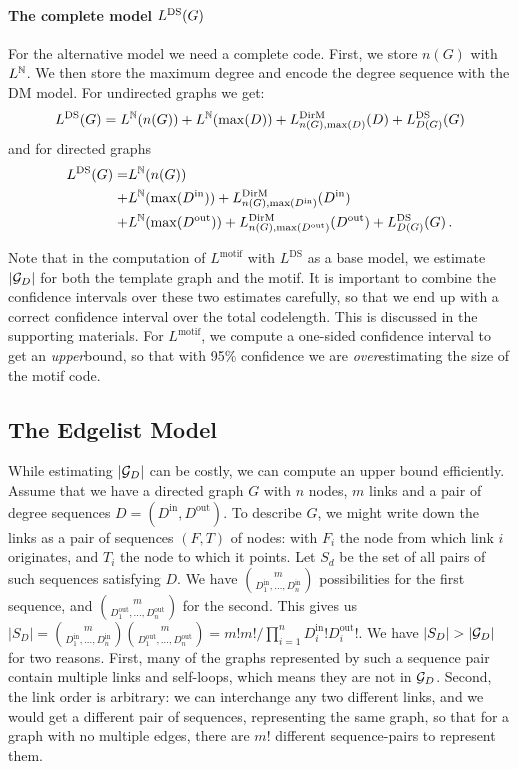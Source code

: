 \paragraph{The complete model $L^\textnormal{DS}(G)$} For the alternative model we need a complete code. First, we store $n(G)$ with $L^{\mathbb N}$. We then store the maximum degree and encode the degree sequence with the DM model. For undirected graphs we get: 
\[
L^\text{DS}(G) = L^{\mathbb N}(n(G)) + L^{\mathbb N}(\max(D)) + L^\text{DirM}_{n(G), \max(D)}(D) + L^\text{DS}_{D(G)}(G)
\]
and for directed graphs
\begin{align*}
L^\text{DS}(G) = &L^{\mathbb N}(n(G)) \\ 
 + &L^{\mathbb N}(\max(D^\text{in})) + L^\text{DirM}_{n(G), \max(D^\text{in})}(D^\text{in})\\
 + &L^{\mathbb N}(\max(D^\text{out})) + L^\text{DirM}_{n(G), \max(D^\text{out})}(D^\text{out}) + L^\text{DS}_{D(G)}(G) \,\text{.}
\end{align*} 

Note that in the computation of $L^\text{motif}$ with $L^\text{DS}$ as a base model, we estimate $|{\mathcal G}_D|$ for both the template graph and the motif. It is important to combine the confidence intervals over these two estimates carefully, so that we end up with a correct confidence interval over the total codelength. This is discussed in the supporting materials. For $L^\text{motif}$, we compute a one-sided confidence interval to get an \emph{upper}bound, so that with 95\% confidence we are \emph{over}estimating the size of the motif code. 

\subsection*{The Edgelist Model}

While estimating $|{\mathcal G}_D|$ can be costly, we can compute an upper bound efficiently. Assume that we have a directed graph $G$ with $n$ nodes, $m$ links and a pair of degree sequences $D = (D^\text{in}, D^\text{out})$. To describe $G$, we might write down the links as a pair of sequences $(F, T)$ of nodes: with  $F_i$ the node from which link $i$ originates, and $T_i$ the node to which it points. Let $S_d$ be the set of all pairs of such sequences satisfying $D$. We have $ m \choose D_1^\text{in}, \ldots, D_n^\text{in}$ possibilities for the first sequence, and $m \choose D_1^\text{out}, \ldots, D_n^\text{out}$ for the second. This gives us $|S_D| = {m \choose D_1^\text{in}, \ldots, D_n^\text{in}}{m \choose D_1^\text{out}, \ldots, D_n^\text{out}} = m!m! / \prod_{i=1}^n D^\text{in}_i ! D^\text{out}_i !$. We have $|S_D| > |{\mathcal G}_D|$ for two reasons. First, many of the graphs represented by such a sequence pair contain multiple links and self-loops, which means they are not in ${\mathcal G}_D$. Second, the link order is arbitrary: we can interchange any two different links, and we would get a different pair of sequences, representing the same graph, so that for a graph with no multiple edges, there are $m!$ different sequence-pairs to represent them. 

